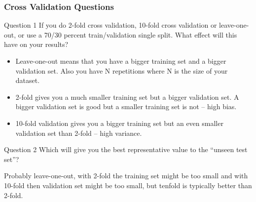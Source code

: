 \documentclass[aspectratio=169, 10pt]{beamer}
\begin{document}
\begin{frame}
    \frametitle{Cross Validation Questions}
    \begin{block}{Question 1}
        If you do 2-fold cross validation, 10-fold cross validation or leave-one-out, or use a 70/30 percent train/validation single split.  What effect will this have on your results?
    \end{block}
    
    \begin{itemize}
        \item Leave-one-out means that you have a bigger training set and a bigger validation set. Also you have N repetitions where N is the size of your dataset.
        \item 2-fold gives you a much smaller training set but a bigger validation set.  A bigger validation set is good but a smaller training set is not – high bias.
        \item 10-fold validation gives you a bigger training set but an even smaller validation set than 2-fold – high variance.
    \end{itemize}

    \begin{block}{Question 2}
        Which will give you the best representative value to the “unseen test set”?
    \end{block}

    Probably leave-one-out, with 2-fold the training set might be too small and with 10-fold then validation set might be too small, but tenfold is typically better than 2-fold.

\end{frame}
\end{document}
